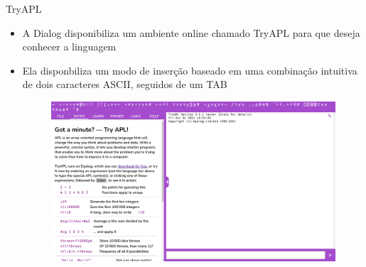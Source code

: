 \begin{frame}[fragile]{TryAPL}

    \begin{itemize}
        \item A Dialog disponibiliza um ambiente online chamado TryAPL para que deseja conhecer a linguagem
        \pause

        \item Ela disponbiliza um modo de inserção baseado em uma combinação intuitiva de dois caracteres ASCII, seguidos de um TAB

        \begin{figure}
            \centering
            \includegraphics[scale=0.125]{figs/tryapl.png}
        \end{figure}

    \end{itemize}

\end{frame}
